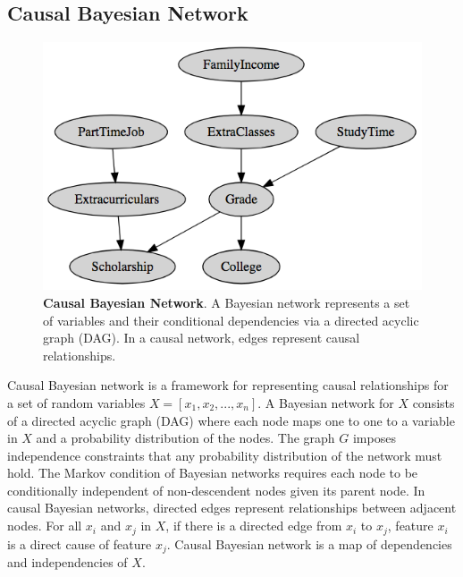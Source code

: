 \subsection{Causal Bayesian Network} \label{CBN}
\begin{figure}[h]
\centering
\includegraphics[width=1\textwidth]{CBN}
\caption{\textbf{Causal Bayesian Network}. A Bayesian network represents a set of variables and their conditional dependencies via a directed acyclic graph (DAG). In a causal network, edges represent causal relationships.}\label{fig:CBN}
\end{figure}

Causal Bayesian network is a framework for representing causal relationships for a set of random variables \(X = [x_1, x_2, ..., x_n]\). A Bayesian network for \(X\) consists of a directed acyclic graph (DAG) where each node maps one to one to a variable in \(X\) and a probability distribution of the nodes. The graph \(G\) imposes independence constraints that any probability distribution of the network must hold.  The Markov condition of Bayesian networks requires each node to be conditionally independent of non-descendent nodes given its parent node. In causal Bayesian networks, directed edges represent relationships between adjacent nodes. For all \(x_i\) and \(x_j\) in \(X\), if there is a directed edge from \(x_i\) to \(x_j\), feature \(x_i\) is a direct cause of feature \(x_j\). Causal Bayesian network is a map of dependencies and independencies of \(X\). 

